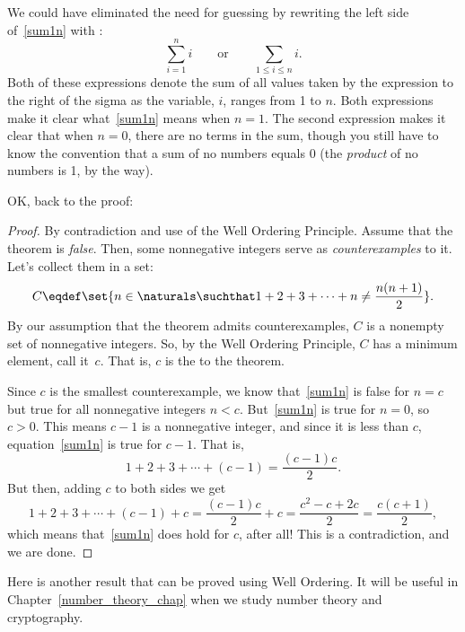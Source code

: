 We could have eliminated the need for guessing by rewriting the left side
of~\eqref{sum1n} with :
\[
\sum_{i=1}^n i
\qquad \text{or} \qquad
\sum_{1 \leq i \leq n} i.
\]
Both of these expressions denote the sum of all values taken by the
expression to the right of the sigma as the variable, $i$, ranges from 1
to $n$.  Both expressions make it clear what~\eqref{sum1n} means when
$n=1$.  The second expression makes it clear that when $n=0$, there are no
terms in the sum, though you still have to know the convention that a sum
of no numbers equals 0 (the \emph{product} of no numbers is 1, by the
way).

OK, back to the proof:

\begin{proof}
By contradiction and use of the Well Ordering Principle.  Assume that
the theorem is \emph{false}.  Then, some nonnegative integers serve as
\emph{counterexamples} to it. Let's collect them in a set:
\[
C \eqdef \set{n\in\naturals \suchthat 
        1 + 2 + 3 + \cdots + n \neq \frac{n(n+1)}{2}}.
\]
By our assumption that the theorem admits counterexamples, $C$ is a
nonempty set of nonnegative integers.  So, by the Well Ordering Principle,
$C$ has a minimum element, call it~$c$.  That is, $c$ is the
\emph{} to the theorem.

Since $c$ is the smallest counterexample, we know that~\eqref{sum1n} is
false for $n=c$ but true for all nonnegative integers $n<c$.
But~\eqref{sum1n} is true for $n=0$, so $c > 0$.  This means $c-1$ is a
nonnegative integer, and since it is less than $c$, equation~\eqref{sum1n}
is true for $c-1$.  That is,
\[
        1 + 2 + 3 + \cdots + (c-1) = \frac{(c-1)c}{2}.
\]
But then, adding $c$ to both sides we get
\[
1 + 2 + 3 + \cdots + (c-1) + c 
        = \frac{(c-1)c}{2} + c
        = \frac{c^2 - c + 2c}{2} 
        = \frac{c(c+1)}{2},
\]
which means that~\eqref{sum1n} does hold for $c$, after all!  This is a
contradiction, and we are done.
\end{proof}

Here is another result that can be proved using Well Ordering.  It
will be useful in Chapter~\ref{number_theory_chap} when we study
number theory and cryptography.

